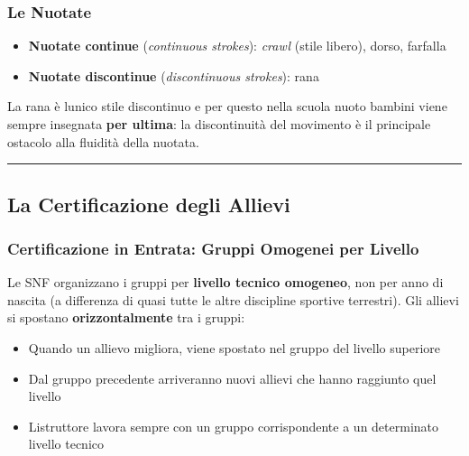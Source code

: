 \documentclass[a4paper,11pt]{article}
\providecommand{\tightlist}{%
  \setlength{\itemsep}{0pt}\setlength{\parskip}{0pt}}
\begin{document}
\subsubsection{Le Nuotate}\label{le-nuotate}

\begin{itemize}
      \tightlist
      \item
            \textbf{Nuotate continue} (\emph{continuous strokes}): \emph{crawl}
            (stile libero), dorso, farfalla
      \item
            \textbf{Nuotate discontinue} (\emph{discontinuous strokes}): rana
\end{itemize}

La rana è l\textquotesingle unico stile discontinuo e per questo nella
scuola nuoto bambini viene sempre insegnata \textbf{per ultima}: la
discontinuità del movimento è il principale ostacolo alla fluidità della
nuotata.

\begin{center}\rule{0.5\linewidth}{0.5pt}\end{center}

\subsection{La Certificazione degli
      Allievi}\label{la-certificazione-degli-allievi}

\subsubsection{Certificazione in Entrata: Gruppi Omogenei per
      Livello}\label{certificazione-in-entrata-gruppi-omogenei-per-livello}

Le SNF organizzano i gruppi per \textbf{livello tecnico omogeneo}, non
per anno di nascita (a differenza di quasi tutte le altre discipline
sportive terrestri). Gli allievi si spostano \textbf{orizzontalmente}
tra i gruppi:

\begin{itemize}
      \tightlist
      \item
            Quando un allievo migliora, viene spostato nel gruppo del livello
            superiore
      \item
            Dal gruppo precedente arriveranno nuovi allievi che hanno raggiunto
            quel livello
      \item
            L\textquotesingle istruttore lavora sempre con un gruppo
            corrispondente a un determinato livello tecnico
\end{itemize}
\end{document}
